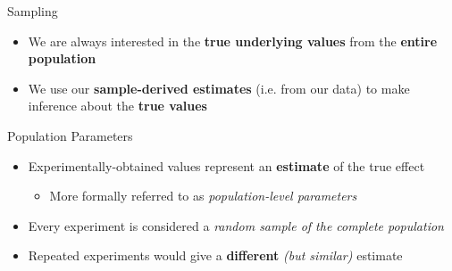\documentclass[aspectratio=169,11pt]{beamer}
\begin{document}
\begin{frame}{Sampling}

	\begin{itemize}
		\item We are always interested in the \textbf{true underlying values} from the \textbf{entire population}
		\item We use our \textbf{sample-derived estimates} (i.e. from our data) to make inference about the \textbf{true values}
	\end{itemize}
		


\end{frame}

%
%	
%	
%
%
%
%	
%

\begin{frame}{Population Parameters}

	\begin{itemize}
		\item Experimentally-obtained values represent an \textbf{estimate} of the true effect
		\begin{itemize}
			\item More formally referred to as \textit{population-level parameters}
		\end{itemize}
		\item Every experiment is considered a \textit{random sample of the complete population}
		\item Repeated experiments would give a \textbf{different} \textit{(but similar)} estimate
	\end{itemize}

\end{frame}
\end{document}
